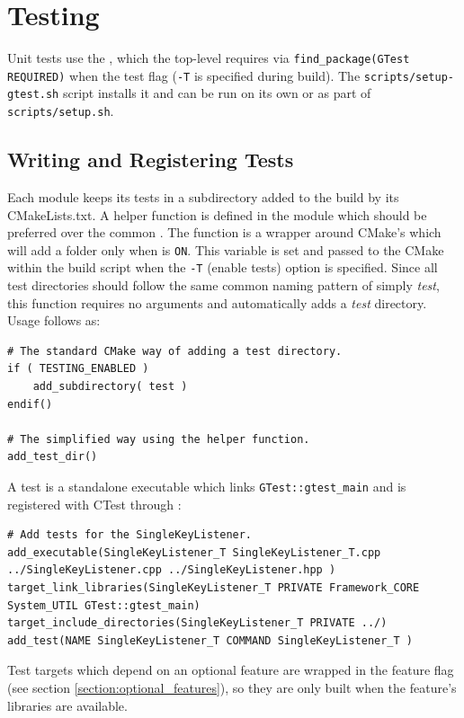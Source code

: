 \section{Testing}\label{section:testing}

Unit tests use the , which the top-level  requires via \texttt{find\_package(GTest REQUIRED)} when the test flag (\texttt{-T} is specified during build). The \texttt{scripts/setup-gtest.sh} script installs it and can be run on its own or as part of \texttt{scripts/setup.sh}.

\subsection{Writing and Registering Tests}\label{section:testing_cmake}

Each module keeps its tests in a  subdirectory added to the build by its CMakeLists.txt. A  helper function is defined in the  module which should be preferred over the common . The  function is a wrapper around CMake's  which will add a  folder only when  is \texttt{ON}. This variable is set and passed to the CMake within the build script when the \texttt{-T} (enable tests) option is specified. Since all test directories should follow the same common naming pattern of simply \textit{test}, this function requires no arguments and automatically adds a \textit{test} directory. Usage follows as:
\begin{lstlisting}[style=makestyle]
# The standard CMake way of adding a test directory.
if ( TESTING_ENABLED )
	add_subdirectory( test )
endif()

# The simplified way using the helper function.
add_test_dir()
\end{lstlisting}

A test is a standalone executable which links \texttt{GTest::gtest\_main} and is registered with CTest through :
\begin{lstlisting}[style=makestyle]
# Add tests for the SingleKeyListener.
add_executable(SingleKeyListener_T SingleKeyListener_T.cpp ../SingleKeyListener.cpp ../SingleKeyListener.hpp )
target_link_libraries(SingleKeyListener_T PRIVATE Framework_CORE System_UTIL GTest::gtest_main)
target_include_directories(SingleKeyListener_T PRIVATE ../)
add_test(NAME SingleKeyListener_T COMMAND SingleKeyListener_T )
\end{lstlisting}
Test targets which depend on an optional feature are wrapped in the feature flag (see section \ref{section:optional_features}), so they are only built when the feature's libraries are available.

